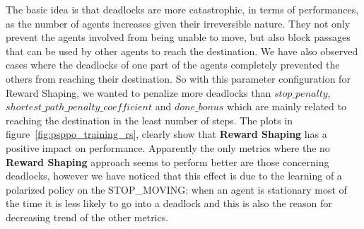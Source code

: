 \documentclass[11pt, a4paper, hidelinks]{report}
\begin{document}
The basic idea is that deadlocks are more catastrophic, in terms of performances, as the number of agents increases given their irreversible nature.
They not only prevent the agents involved from being unable to move, but also block passages that can be used by other agents to reach the destination.
We have also observed cases where the deadlocks of one part of the agents completely prevented the others from reaching their destination.
So with this parameter configuration for Reward Shaping, we wanted to penalize more deadlocks than  \textbf{$stop\_penalty$}, \textbf{$shortest\_path\_penalty\_coefficient$} and \textbf{$done\_bonus$} which are mainly related to reaching the destination in the least number of steps.
The plots in figure~\ref{fig:psppo_training_rs}, clearly show that \textbf{Reward Shaping} has a positive impact on performance.
Apparently the only metrics where the no \textbf{Reward Shaping} approach seems to perform better are those concerning deadlocks, however we have noticed that this effect is due to the learning of a polarized policy on the STOP\_MOVING: when an agent is stationary most of the time it is less likely to go into a deadlock and this is also the reason for decreasing trend of the other metrics.
\end{document}
